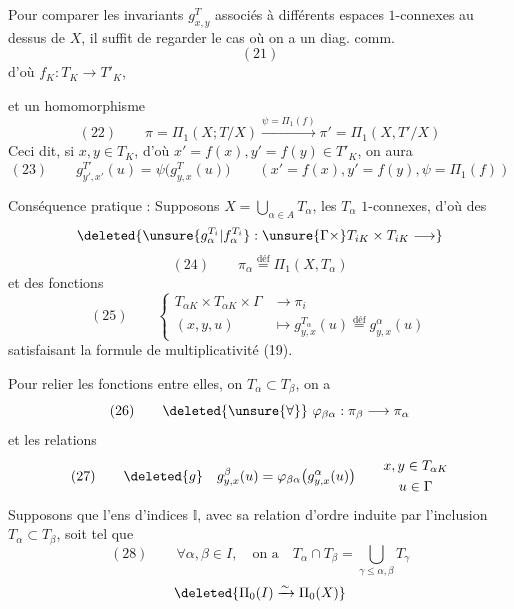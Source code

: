 Pour comparer les invariants $g_{x,y}^T$ associés à différents espaces $1$-connexes au dessus de $X$, il suffit de regarder le cas où on a un diag. comm.
\[
(21)
\]
d'où $f_K:T_K\longrightarrow T'_K$,

et un homomorphisme
\[
(22)\qquad\pi=\Pi_1(X;T/X)\overset{\psi=\Pi_1(f)}{\longrightarrow}\pi'=\Pi_1(X,T'/X)
\]
Ceci dit, si $x,y\in T_K$, d'où $x'=f(x),y'=f(y)\in T'_K$, on aura
\[
(23)\qquad g_{y',x'}^{T'}(u)=\psi\bigl(g_{y,x}^T(u)\bigr)
\qquad(x'=f(x),y'=f(y),\psi=\Pi_1(f))
\]

Conséquence pratique : Supposons $X=\bigcup_{\alpha\in A}T_\alpha$, les $T_\alpha$ $1$-connexes, d'où des  
\[
\deleted{\unsure{g_\alpha^{T_i}|f_\alpha^{T_i}}:\unsure{\Gamma\times}T_{iK}\times T_{iK}\longrightarrow}
\]
\[
(24)\qquad \pi_\alpha\overset{\text{déf}}{=}\Pi_1(X,T_\alpha)
\]
et des fonctions
\[
(25)\qquad\left\{\begin{aligned}
T_{\alpha K}\times T_{\alpha K}\times\Gamma&\longrightarrow\pi_i\\
(x,y,u)&\longmapsto g_{y,x}^{T_\alpha}(u)\overset{\text{déf}}{=}g_{y,x}^{\alpha}(u)
\end{aligned}\right.
\]
satisfaisant la formule de multiplicativité (19).

Pour relier les fonctions entre elles,  on   $T_\alpha\subset T_\beta$, on a
\[
(26)\qquad\deleted{\unsure{\forall}}\ \varphi_{\beta\alpha}:\pi_\beta\longrightarrow\pi_\alpha
\]
et les relations
\[
(27)\qquad\deleted{g}\quad g_{y,x}^{\beta}(u)=\varphi_{\beta\alpha}\bigl(g_{y,x}^{\alpha}(u)\bigr)\qquad\begin{gathered}x,y\in T_{\alpha K}\\u\in\Gamma\end{gathered}
\]
Supposons que l'ens d'indices $\mathbb{I}$, avec sa relation d'ordre induite par l'inclusion $T_\alpha\subset T_\beta$, soit tel que 
\[
(28)\qquad\forall\alpha,\beta\in I,\quad\text{on a}\quad T_\alpha\cap T_\beta=\bigcup_{\gamma\le\alpha,\beta}T_\gamma
\]
\[
\deleted{\Pi_0(I)\xrightarrow{\sim}\Pi_0(X)}
\]

